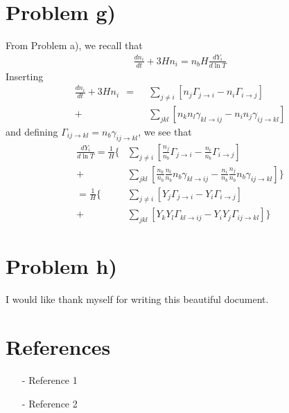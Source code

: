 \documentclass[reprint,english,notitlepage]{revtex4-1}  %
\numberwithin{equation}{section}
\begin{document}
\section{Problem g)}
From Problem a), we recall that
\begin{align}
	\frac{dn_i}{dt} + 3Hn_i = n_b H \frac{dY_i}{d\ln{T}}
\end{align}
Inserting
\begin{align}
	\frac{dn_i}{dt} + 3Hn_i
	\ \	=\ \ &\sum\limits_{j\neq i} [n_j\Gamma_{j\rightarrow i} - n_i\Gamma_{i\rightarrow j}] \\
		+ &\sum\limits_{jkl} [n_k n_l\gamma_{kl\rightarrow ij} - n_i n_j\gamma_{ij\rightarrow kl}]
\end{align}
and defining $\Gamma_{ij\rightarrow kl} = n_b \gamma_{ij\rightarrow kl}$, we see
that
\begin{align}
		  \frac{dY_i}{d\ln{T}}
		= \frac{1}{H}\bigg\{
		  &\sum\limits_{j\neq i} [\frac{n_j}{n_b}\Gamma_{j\rightarrow i} - \frac{n_i}{n_b}\Gamma_{i\rightarrow j}] \\
		+ &\sum\limits_{jkl} [\frac{n_k}{n_b}\frac{n_l}{n_b} n_b\gamma_{kl\rightarrow ij}
													- \frac{n_i}{n_b}\frac{n_j}{n_b} n_b\gamma_{ij\rightarrow kl}]
			\bigg\} \\
		= \frac{1}{H}\bigg\{
		  &\sum\limits_{j\neq i} [Y_j \Gamma_{j\rightarrow i} - Y_i \Gamma_{i\rightarrow j}] \\
		+ &\sum\limits_{jkl} [Y_k Y_l \Gamma_{kl\rightarrow ij}
													- Y_i Y_j \Gamma_{ij\rightarrow kl}]
			\bigg\}
\end{align}
\section{Problem h)}

\begin{acknowledgments}  %
I would like thank myself for writing this beautiful document.
\end{acknowledgments}


\section*{References}  %
\begin{itemize}
\item[-]Reference 1
\item[-]Reference 2
\end{itemize}
\end{document}
